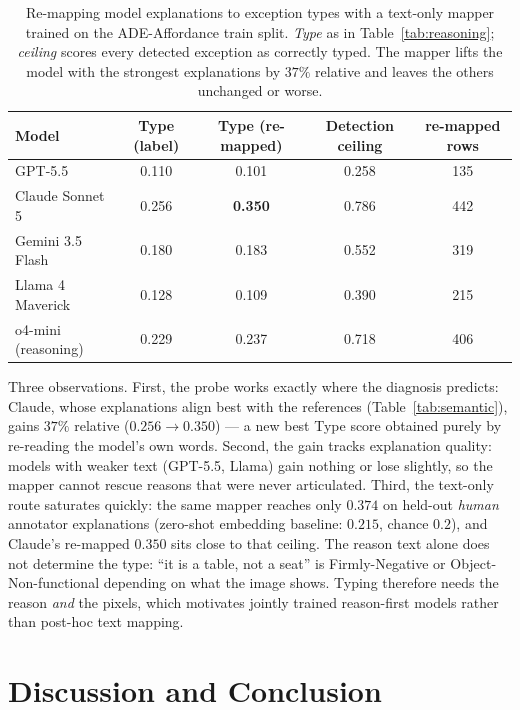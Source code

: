 \documentclass[runningheads]{llncs}
\begin{document}
\begin{table}[t]
  \centering
  \footnotesize
  \caption{Re-mapping model explanations to exception types with a text-only mapper trained on the ADE-Affordance train split. \emph{Type} as in Table~\ref{tab:reasoning}; \emph{ceiling} scores every detected exception as correctly typed. The mapper lifts the model with the strongest explanations by $37\%$ relative and leaves the others unchanged or worse.}
  \label{tab:remap}
  \begin{tabular}{lcccc}
    \toprule
    Model & Type (label) & Type (re-mapped) & Detection ceiling & re-mapped rows \\
    \midrule
    GPT-5.5             & 0.110 & 0.101 & 0.258 & 135 \\
    Claude Sonnet 5     & 0.256 & \textbf{0.350} & 0.786 & 442 \\
    Gemini 3.5 Flash    & 0.180 & 0.183 & 0.552 & 319 \\
    Llama 4 Maverick    & 0.128 & 0.109 & 0.390 & 215 \\
    \midrule
    o4-mini (reasoning) & 0.229 & 0.237 & 0.718 & 406 \\
    \bottomrule
  \end{tabular}
\end{table}

Three observations.
First, the probe works exactly where the diagnosis predicts: Claude, whose explanations align best with the references (Table~\ref{tab:semantic}), gains $37\%$ relative ($0.256\!\to\!0.350$) --- a new best Type score obtained purely by re-reading the model's own words.
Second, the gain tracks explanation quality: models with weaker text (GPT-5.5, Llama) gain nothing or lose slightly, so the mapper cannot rescue reasons that were never articulated.
Third, the text-only route saturates quickly: the same mapper reaches only $0.374$ on held-out \emph{human} annotator explanations (zero-shot embedding baseline: $0.215$, chance $0.2$), and Claude's re-mapped $0.350$ sits close to that ceiling.
The reason text alone does not determine the type: ``it is a table, not a seat'' is Firmly-Negative or Object-Non-functional depending on what the image shows.
Typing therefore needs the reason \emph{and} the pixels, which motivates jointly trained reason-first models rather than post-hoc text mapping.


\section{Discussion and Conclusion}
\label{sec:discussion}
\end{document}
